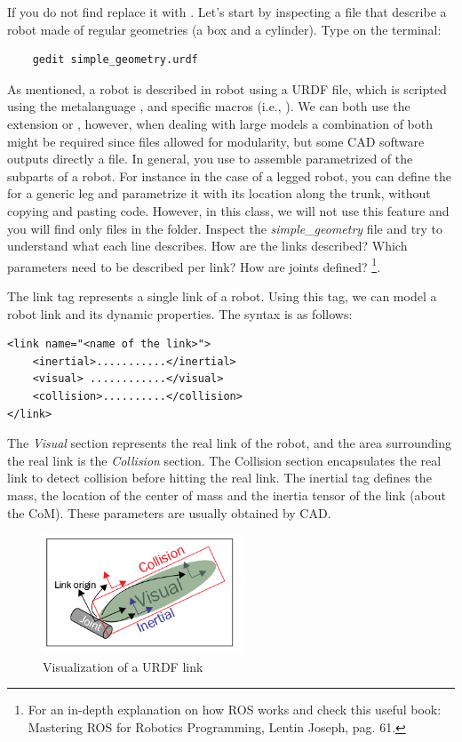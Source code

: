 \documentclass[11pt]{article}
\begin{document}
 If you do not find \codeword{~} replace it with .
Let's start by inspecting a file that describe a robot made of regular geometries (a box and a cylinder). Type on the terminal:

\begin{verbatim}
	gedit simple_geometry.urdf
\end{verbatim}

As mentioned, a robot is described in robot using a URDF file, which is scripted using the metalanguage , and specific  macros (i.e., ). We can both use the extension  or , however, when dealing with large models a combination of both might be required since  files allowed for modularity, but some CAD software outputs directly a  file. In general, you use   to assemble  parametrized   of the subparts of a robot. For instance in the case of a legged robot, you can define the   for a generic leg and parametrize it with its location along the trunk, without copying and pasting code. However, in this class, we will not use this feature and you will find only  files in the folder. 
Inspect the \textit{simple\_geometry} file and try to understand what each line describes. How are the links described? Which parameters need to be described per link? How are joints defined? \footnote{For an in-depth explanation on how ROS works and check this useful book: Mastering ROS for Robotics	Programming, Lentin Joseph, pag. 61.}. 

The link tag represents a single link of a robot. Using this tag, we
can model a robot link and its dynamic properties. The syntax is as follows:
	
\begin{Verbatim}	
<link name="<name of the link>">
	<inertial>...........</inertial>
	<visual> ............</visual>
	<collision>..........</collision>
</link>
\end{Verbatim}

The \textit{Visual} section represents the real link of the robot, and the area surrounding the real link
is the \textit{Collision} section. The Collision section encapsulates the real link to
detect collision before hitting the real link. The inertial tag defines the mass, the location of the center of mass and the inertia tensor of the link (about the CoM). These parameters are usually obtained by CAD.

\begin{figure}[H]
	\centering
	\includegraphics[width=6cm]{pics/link.png}
	\caption{Visualization of a URDF link}
	\label{fig:link}
\end{figure}
\end{document}
